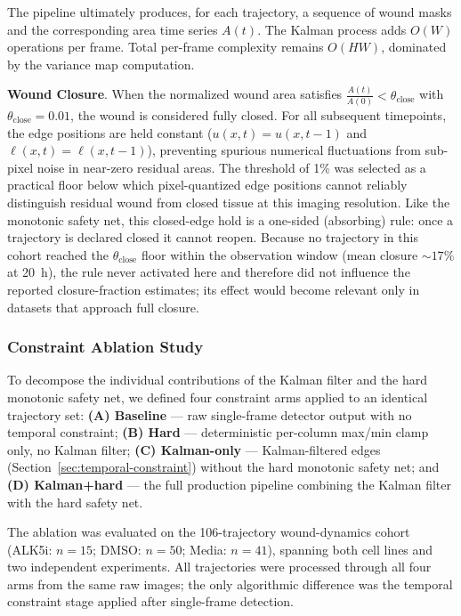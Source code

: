 The pipeline ultimately produces, for each trajectory, a sequence of wound masks and the corresponding area time series $A(t)$. The Kalman process adds $O(W)$ operations per frame. Total per-frame complexity remains $O(HW)$, dominated by the variance map computation.

 
\textbf{Wound Closure}.
When the normalized wound area satisfies $\frac{A(t)}{A(0)} < \theta_\text{close}$ with $\theta_\text{close} = 0.01$, the wound is considered fully closed. For all subsequent timepoints, the edge positions are held constant ($u(x,t) = u(x,t-1)$ and $\ell(x,t) = \ell(x,t-1)$), preventing spurious numerical fluctuations from sub-pixel noise in near-zero residual areas. The threshold of 1\% was selected as a practical floor below which pixel-quantized edge positions cannot reliably distinguish residual wound from closed tissue at this imaging resolution. Like the monotonic safety net, this closed-edge hold is a one-sided (absorbing) rule: once a trajectory is declared closed it cannot reopen. Because no trajectory in this cohort reached the $\theta_\text{close}$ floor within the observation window (mean closure ${\sim}17\%$ at 20~h), the rule never activated here and therefore did not influence the reported closure-fraction estimates; its effect would become relevant only in datasets that approach full closure.


\subsubsection{Constraint Ablation Study}
\label{sec:ablation-design}

To decompose the individual contributions of the Kalman filter and the hard monotonic safety net, we defined four constraint arms applied to an identical trajectory set:
\textbf{(A) Baseline} --- raw single-frame detector output with no temporal constraint;
\textbf{(B) Hard} --- deterministic per-column max/min clamp only, no Kalman filter;
\textbf{(C) Kalman-only} --- Kalman-filtered edges (Section~\ref{sec:temporal-constraint}) without the hard monotonic safety net; and
\textbf{(D) Kalman+hard} --- the full production pipeline combining the Kalman filter with the hard safety net.

The ablation was evaluated on the 106-trajectory wound-dynamics cohort (ALK5i: $n=15$; DMSO: $n=50$; Media: $n=41$), spanning both cell lines and two independent experiments.
All trajectories were processed through all four arms from the same raw images; the only algorithmic difference was the temporal constraint stage applied after single-frame detection.

